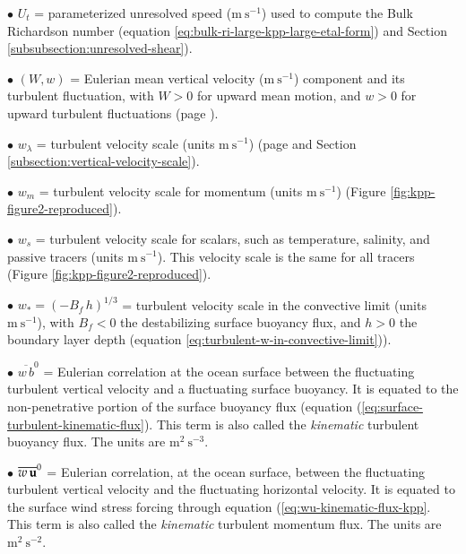 \begin{trivlist}
\item[$\bullet$] $U_{t}$ = parameterized unresolved speed
  ($\mbox{m}~\mbox{s}^{-1}$) used to compute the Bulk Richardson
  number (equation \ref{eq:bulk-ri-large-kpp-large-etal-form}) and
  Section \ref{subsubsection:unresolved-shear}).

\item[$\bullet$] $(W,w)$ = Eulerian mean vertical velocity
  ($\mbox{m}~\mbox{s}^{-1}$) component and its turbulent fluctuation,
  with $W > 0$ for upward mean motion, and $w > 0$ for upward
  turbulent fluctuations (page \pageref{w_W_defined}).

\item[$\bullet$] $w_{\lambda}$ = turbulent velocity scale (units
  $\mbox{m}~\mbox{s}^{-1}$) (page 
  \pageref{subsubsection:turbulent-vertical-velocity-scale} and
  Section \ref{subsection:vertical-velocity-scale}).

\item[$\bullet$] $w_{m}$ = turbulent velocity scale for momentum
  (units $\mbox{m}~\mbox{s}^{-1}$) (Figure
  \ref{fig:kpp-figure2-reproduced}).

\item[$\bullet$] $w_{s}$ = turbulent velocity scale for scalars, such
  as temperature, salinity, and passive tracers (units
  $\mbox{m}~\mbox{s}^{-1}$).  This velocity scale is the same for all
  tracers (Figure \ref{fig:kpp-figure2-reproduced}).

\item[$\bullet$] $w_{*} = (-B_{f} \, h)^{1/3}$ = turbulent velocity
  scale in the convective limit (units $\mbox{m}~\mbox{s}^{-1}$), with
  $B_{f} < 0$ the destabilizing surface buoyancy flux, and $h > 0$ the
  boundary layer depth (equation
  \ref{eq:turbulent-w-in-convective-limit})).

\item[$\bullet$] $\overline{w \, b}^{0}$ = Eulerian correlation at
  the ocean surface between the fluctuating turbulent vertical
  velocity and a fluctuating surface buoyancy. It is equated to the
  non-penetrative portion of the surface buoyancy flux (equation
  (\ref{eq:surface-turbulent-kinematic-flux}).  This term is also
  called the {\it kinematic} turbulent buoyancy flux.  The units are
  $\mbox{m}^{2}~\mbox{s}^{-3}$.

\item[$\bullet$] $\overline{w \, {\bf u}}^{0}$ = Eulerian
  correlation, at the ocean surface, between the fluctuating turbulent
  vertical velocity and the fluctuating horizontal velocity. It is
  equated to the surface wind stress forcing through equation
  (\ref{eq:wu-kinematic-flux-kpp}.  This term is also called the {\it
    kinematic} turbulent momentum flux.  The units are
  $\mbox{m}^{2}~\mbox{s}^{-2}$.


\end{trivlist}

